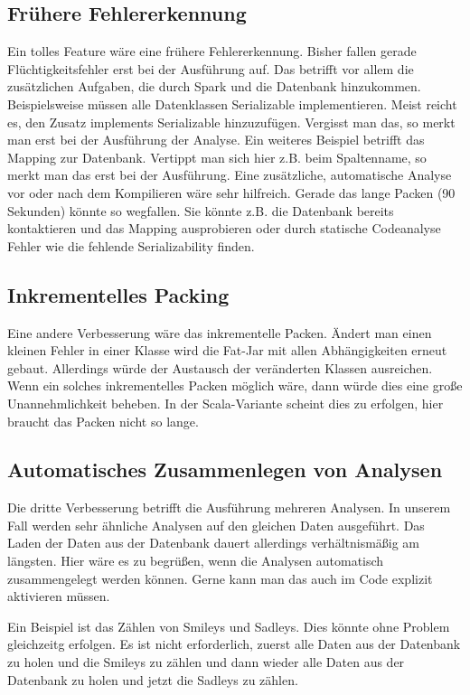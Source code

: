 \bigskip

\subsection{Frühere Fehlererkennung}
Ein tolles Feature wäre eine frühere Fehlererkennung. Bisher fallen
gerade Flüchtigkeitsfehler erst bei der Ausführung auf. Das betrifft
vor allem die zusätzlichen Aufgaben, die durch Spark und die Datenbank
hinzukommen. Beispielsweise müssen alle Datenklassen Serializable
implementieren. Meist reicht es, den Zusatz implements Serializable
hinzuzufügen. Vergisst man das, so merkt man erst bei der Ausführung
der Analyse. Ein weiteres Beispiel betrifft das Mapping zur Datenbank.
Vertippt man sich hier z.B. beim Spaltenname, so merkt man das erst bei
der Ausführung. Eine zusätzliche, automatische Analyse vor oder nach
dem Kompilieren wäre sehr hilfreich. Gerade das lange Packen (90
Sekunden) könnte so wegfallen. Sie könnte z.B. die Datenbank bereits
kontaktieren und das Mapping ausprobieren oder durch statische
Codeanalyse Fehler wie die fehlende Serializability finden.

\subsection{Inkrementelles Packing}
Eine andere Verbesserung wäre das inkrementelle Packen. Ändert man einen
kleinen Fehler in einer Klasse wird die Fat-Jar mit allen
Abhängigkeiten erneut gebaut. Allerdings würde der Austausch der
veränderten Klassen ausreichen. Wenn ein solches inkrementelles Packen
möglich wäre, dann würde dies eine große Unannehmlichkeit beheben. In
der Scala-Variante scheint dies zu erfolgen, hier braucht das Packen
nicht so lange.

\subsection{Automatisches Zusammenlegen von
Analysen}
Die dritte Verbesserung betrifft die Ausführung mehreren Analysen. In
unserem Fall werden sehr ähnliche Analysen auf den gleichen Daten
ausgeführt. Das Laden der Daten aus der Datenbank dauert allerdings
verhältnismäßig am längsten. Hier wäre es zu begrüßen, wenn die
Analysen automatisch zusammengelegt werden können. Gerne kann man das
auch im Code explizit aktivieren müssen.

Ein Beispiel ist das Zählen von Smileys und Sadleys. Dies könnte ohne
Problem gleichzeitg erfolgen. Es ist nicht erforderlich, zuerst alle
Daten aus der Datenbank zu holen und die Smileys zu zählen und dann
wieder alle Daten aus der Datenbank zu holen und jetzt die Sadleys zu
zählen.

